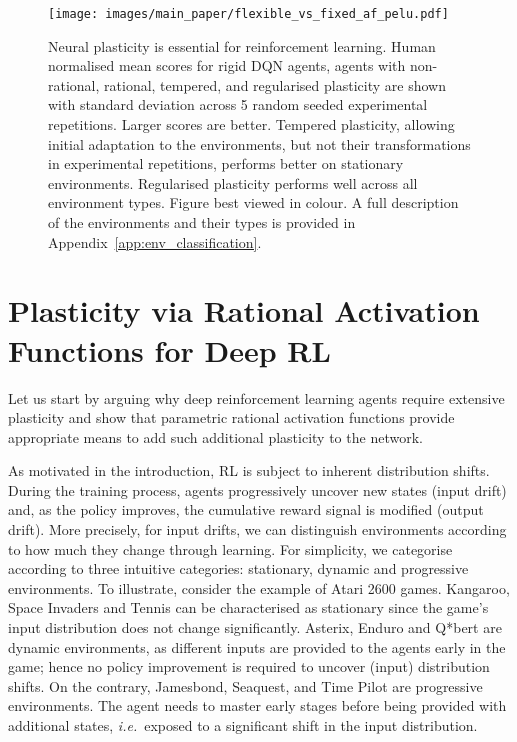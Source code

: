 \documentclass[accepted]{article}
\theoremstyle{plain}
\theoremstyle{definition}
\theoremstyle{remark}
\newcommand{\ie}{\emph{i.e.}~}
\begin{document}
\begin{figure*}[t]
    \centering
    \texttt{[image: images/main\_paper/flexible\_vs\_fixed\_af\_pelu.pdf]}
    \vspace{-0.6 cm}
    \caption{Neural plasticity is essential for reinforcement learning. Human normalised mean scores for rigid DQN agents, agents with non-rational, rational, tempered, and regularised plasticity are shown with standard deviation across 5 random seeded experimental repetitions. Larger scores are better. Tempered plasticity, allowing initial adaptation to the environments, but not their transformations in experimental repetitions, performs better on stationary environments. Regularised plasticity performs well across all environment types. Figure best viewed in colour. A full description of the environments and their types is provided in Appendix~\ref{app:env_classification}.
    \label{fig:neural_plasticity}}
\end{figure*}


\section{Plasticity via Rational Activation Functions for Deep RL} 
Let us start by arguing why deep reinforcement learning agents require extensive plasticity and show that parametric rational activation functions provide appropriate means to add such additional plasticity to the network. 

As motivated in the introduction, RL is subject to inherent distribution shifts. During the training process, agents progressively uncover new states (input drift) and, as the policy improves, the cumulative reward signal is modified (output drift). More precisely, for input drifts, we can distinguish environments according to how much they change through learning. For simplicity, we categorise according to three intuitive categories: stationary, dynamic and progressive environments. 
To illustrate, consider the example of Atari 2600 games. Kangaroo, Space Invaders and Tennis can be characterised as stationary since the game's input distribution does not change significantly. 
Asterix, Enduro and Q*bert are dynamic environments, as different inputs are provided to the agents early in the game; hence no policy improvement is required to uncover (input) distribution shifts. 
On the contrary, Jamesbond, Seaquest, and Time Pilot are progressive environments. The agent needs to master early stages before being provided with additional states, \ie exposed to a significant shift in the input distribution. 
\end{document}
